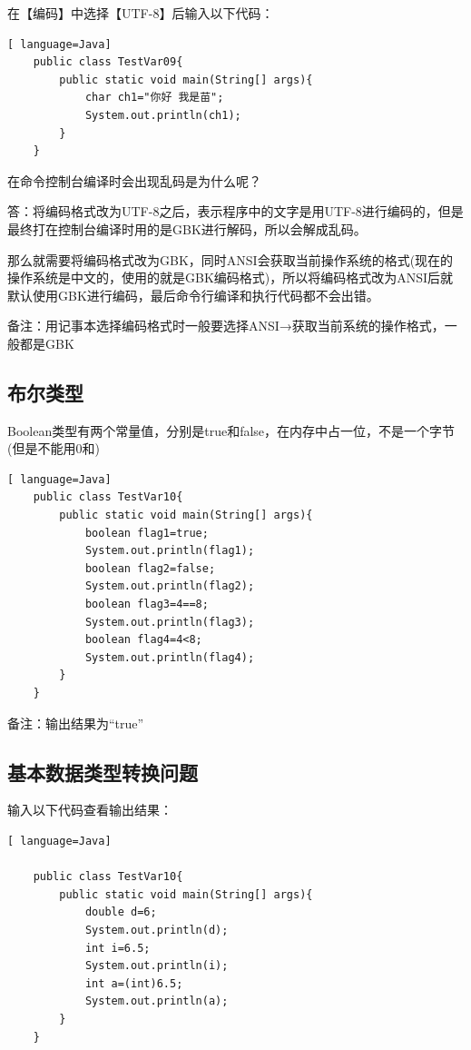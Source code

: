 \documentclass{article}
\begin{document}
	在【编码】中选择【UTF-8】后输入以下代码：
	
	\begin{lstlisting}[ language=Java]
	public class TestVar09{
		public static void main(String[] args){
			char ch1="你好 我是苗";
			System.out.println(ch1);
		}
	}		
	\end{lstlisting}	
	
	在命令控制台编译时会出现乱码是为什么呢？
	
	答：将编码格式改为UTF-8之后，表示程序中的文字是用UTF-8进行编码的，但是最终打在控制台编译时用的是GBK进行解码，所以会解成乱码。
	
	\setlength{\parindent}{4em}那么就需要将编码格式改为GBK，同时ANSI会获取当前操作系统的格式(现在的操作系统是中文的，使用的就是GBK编码格式)，所以将编码格式改为ANSI后就默认使用GBK进行编码，最后命令行编译和执行代码都不会出错。
	
	备注：用记事本选择编码格式时一般要选择ANSI→获取当前系统的操作格式，一般都是GBK
		
	\setlength{\parindent}{2em}
	
	\subsection{布尔类型}
	
	Boolean类型有两个常量值，分别是true和false，在内存中占一位，不是一个字节(但是不能用0和)
	
	\begin{lstlisting}[ language=Java]
	public class TestVar10{
		public static void main(String[] args){
			boolean flag1=true;
			System.out.println(flag1);
			boolean flag2=false;
			System.out.println(flag2);
			boolean flag3=4==8;
			System.out.println(flag3);
			boolean flag4=4<8;
			System.out.println(flag4);
		}
	}		
	\end{lstlisting}
	
	备注：输出结果为“true”
	
	\subsection{基本数据类型转换问题} 
	
	输入以下代码查看输出结果：
	
	\begin{lstlisting}[ language=Java]
	
	public class TestVar10{
		public static void main(String[] args){
			double d=6;	
			System.out.println(d);
			int i=6.5;
			System.out.println(i);
			int a=(int)6.5;
			System.out.println(a);
		}
	}
	\end{lstlisting}	
	
\end{document}
